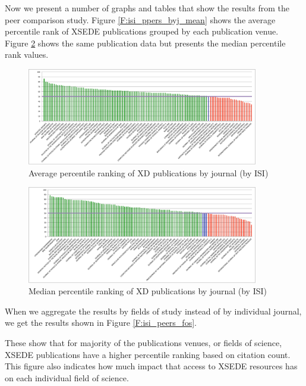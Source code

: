 \documentclass{sig-alternate}
\begin{document}
Now we present a number of graphs and tables that show the results
from the peer comparison study. Figure \ref{F:isi_ppers_byj_mean}
shows the average percentile rank of XSEDE publications grouped by
each publication venue. Figure \ref{F:isi_peers_byj_median} shows the
same publication data but presents the median percentile rank values.

\begin{figure}[htb!]
  \centering
    \includegraphics[width=0.9\textwidth]{images/isi_peers_byj_mean.pdf}
    \caption{Average percentile ranking of XD publications by journal (by ISI)}
    \label{F:isi_peers_byj_mean}
\end{figure}

\begin{figure}[htb!]
  \centering
    \includegraphics[width=0.9\textwidth]{images/isi_peers_byj_median.pdf}
    \caption{Median percentile ranking of XD publications by journal (by ISI)}
    \label{F:isi_peers_byj_median}
\end{figure}

When we aggregate the results by fields of study instead of by
individual journal, we get the results shown in Figure
\ref{F:isi_peers_fos}.

These show that for majority of the publications venues, or fields of
science, XSEDE publications have a higher percentile ranking based on
citation count. This figure also indicates how much impact that access
to XSEDE resources has on each individual field of science.
\end{document}
